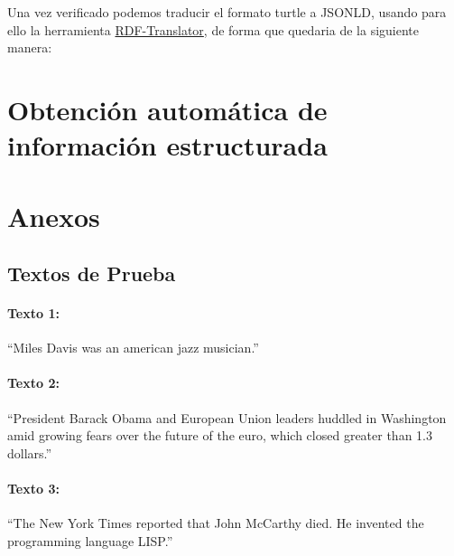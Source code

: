 \documentclass[spanish]{llncs}   %
\begin{document}
Una vez verificado podemos traducir el formato turtle a JSONLD, usando para ello la herramienta \href{https://rdf-translator.appspot.com}{RDF-Translator}, de forma que quedaria de la siguiente manera:




\section{Obtención automática de información estructurada}

\section{Anexos}

\subsection{Textos de Prueba}\label{Textos}

\paragraph{Texto 1:}

“Miles Davis was an american jazz musician.”

\paragraph{Texto 2:}
“President Barack Obama and European Union leaders huddled in Washington amid growing fears over the future of the euro, which closed greater than 1.3 dollars.”

\paragraph{Texto 3:}
“The New York Times reported that John McCarthy died. He invented the programming language LISP.”
\end{document}
